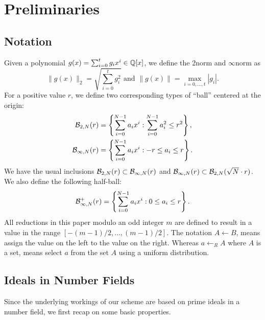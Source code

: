 

\section{Preliminaries}

\subsection{Notation}

Given a polynomial $g(x)=\sum_{i=0}^{t}{g_i x^i} \in \mathbb{Q}[x]$, we define the 2\ndash norm and $\infty$\ndash norm as
\[
\|g(x)\|_2 = \sqrt{\sum_{i=0}^{t}{g_i^2}} \text{ and } \| g(x) \| = \max_{i=0, \dots, t} |g_i|.
\]
For a positive value $r$, we define two corresponding types of “ball” centered at the origin:
\begin{align*}
\mathcal{B}_{2, N}(r)&=\left\{ \sum_{i=0}^{N-1}{a_i x^i} : \sum_{i=0}^{N-1}{a_i^2 \le r^2} \right\},\\
\mathcal{B}_{\infty, N}(r)&=\left\{ \sum_{i=0}^{N-1}{a_i x^i} : {-r \le a_i \le r} \right\}.
\end{align*}
We have the usual inclusions $\mathcal{B}_{2, N}(r) \subset \mathcal{B}_{\infty, N}(r)$ and $\mathcal{B}_{\infty, N}(r) \subset \mathcal{B}_{2, N}(\sqrt{N} \cdot r)$.
We also define the following half-ball:
\[
\mathcal{B}_{\infty, N}^{+}(r)=\left\{ \sum_{i=0}^{N-1}{a_i x^i} : {0 \le a_i \le r} \right\}.
\]
All reductions in this paper modulo an odd integer $m$ are defined to result in a value in the range $[-(m-1)/2, \ldots, (m-1)/2]$. 
The notation $A\leftarrow B$, means assign the value on the left to the value on the right. Whereas $a \leftarrow _R A$ where $A$ is a set, means select $a$ from the set $A$ using a uniform distribution.

\subsection{Ideals in Number Fields}

Since the underlying workings of our scheme are based on prime ideals in a number field, we first recap on some basic properties.

